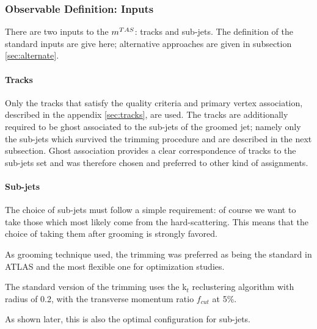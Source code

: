  



\subsubsection{Observable Definition: Inputs}
There are two inputs to the $m^{TAS}$: tracks and sub-jets. The definition of the standard inputs are give here; alternative approaches are given in subsection \ref{sec:alternate}.

\paragraph{Tracks}
Only the tracks that satisfy the quality criteria and primary vertex association, described in the appendix \ref{sec:tracks}, are used.
The tracks are additionally required to be ghost associated to the sub-jets of the groomed jet; namely only the sub-jets which survived the trimming procedure and are described in the next subsection.
Ghost association provides a clear correspondence of tracks to the sub-jets set and was therefore chosen and preferred to other kind of assignments.

\paragraph{Sub-jets}

The choice of sub-jets must follow a simple requirement: of course we want to take those which most likely come from the hard-scattering. This means that the choice of taking them after grooming is strongly favored.

As grooming technique used, the trimming was preferred as being the standard in ATLAS and the most flexible one for optimization studies.

The standard version of the trimming uses the k$_t$ reclustering algorithm with radius of 0.2, with the transverse momentum ratio $f_{cut}$ at 5\%.

As shown later, this is also the optimal configuration for sub-jets.


